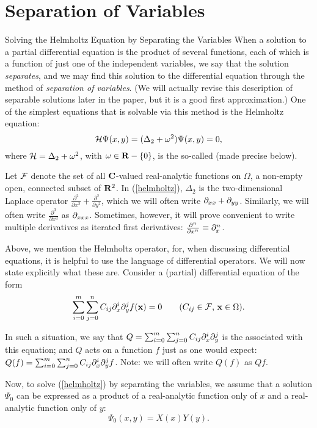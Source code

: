 \chapter{Separation of Variables}

\begin{section}{Solving the Helmholtz Equation by Separating the Variables}
When a solution to a partial differential equation is the product of several functions, each of which is a function of just one of the independent variables, we say that the solution \emph{separates}, and we may find this solution to the differential equation through the method of \emph{separation of variables}.  (We will actually revise this description of separable solutions later in the paper, but it is a good first approximation.)  One of the simplest equations that is solvable via this method is the Helmholtz equation:
\begin{equation}
\label{helmholtz}
\mathcal{H} \Psi(x, y) = (\Delta_2 + \omega^2)\Psi(x, y) = 0,
\end{equation}
where $\mathcal{H} = \Delta_2 + \omega^2$, with $\omega \in \mathbf{R} - \{ 0 \}$, is the so-called  (made precise below).

Let $\mathcal{F}$ denote the set of all $\mathbf{C}$-valued real-analytic functions on $\Omega$, a non-empty open, connected subset of $\mathbf{R}^2$.  In (\ref{helmholtz}), $\Delta_2$ is the two-dimensional Laplace operator $\frac{\partial^2}{\partial x^2} + \frac{\partial^2}{\partial y^2}$, which we will often write $\partial_{x x} + \partial_{y y}$.  Similarly, we will often write $\frac{\partial^3}{\partial x^3}$ as $\partial_{x x x}$.  Sometimes, however, it will prove convenient to write multiple derivatives as iterated first derivatives: $\frac{\partial^n}{\partial x^n} \equiv \partial_{x}^n$.

Above, we mention the Helmholtz operator, for, when discussing differential equations, it is helpful to use the language of differential operators.  We will now state explicitly what these are.  Consider a (partial) differential equation of the form
\[
\sum_{i=0}^m\sum_{j=0}^nC_{ij}\partial_{x}^i \partial_{y}^j f(\mathbf{x}) = 0 \qquad \mbox{($C_{ij} \in \mathcal{F}$, $\mathbf{x} \in \Omega$)}.
\]

In such a situation, we say that $Q = \sum_{i=0}^m\sum_{j=0}^nC_{ij}\partial_{x}^i \partial_{y}^j$ is the  associated with this equation; and $Q$ acts on a function $f$ just as one would expect: $Q(f) = \sum_{i=0}^m\sum_{j=0}^nC_{ij}\partial_{x}^i \partial_{y}^j f$.  Note: we will often write $Q(f)$ as $Qf$.

Now, to solve (\ref{helmholtz}) by separating the variables, we assume that a solution $\Psi_0$ can be expressed as a product of a real-analytic function only of $x$ and a real-analytic function only of $y$:
\[
\Psi_0(x,y) = X(x)Y(y).
\]


\end{section}
